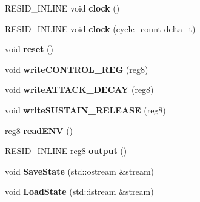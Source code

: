 \begin{DoxyCompactItemize}
\item 
\hypertarget{classEnvelopeGenerator_a5ecc39fc11bc972f8648734f4cc0cf89}{R\-E\-S\-I\-D\-\_\-\-I\-N\-L\-I\-N\-E void {\bfseries clock} ()}\label{classEnvelopeGenerator_a5ecc39fc11bc972f8648734f4cc0cf89}

\item 
\hypertarget{classEnvelopeGenerator_ad5946858b8f732804c1d030c1af5359e}{R\-E\-S\-I\-D\-\_\-\-I\-N\-L\-I\-N\-E void {\bfseries clock} (cycle\-\_\-count delta\-\_\-t)}\label{classEnvelopeGenerator_ad5946858b8f732804c1d030c1af5359e}

\item 
\hypertarget{classEnvelopeGenerator_a64179e4784e307cf16f4933f225dbcbc}{void {\bfseries reset} ()}\label{classEnvelopeGenerator_a64179e4784e307cf16f4933f225dbcbc}

\item 
\hypertarget{classEnvelopeGenerator_a4b15ac369e854d24f544680629b1729d}{void {\bfseries write\-C\-O\-N\-T\-R\-O\-L\-\_\-\-R\-E\-G} (reg8)}\label{classEnvelopeGenerator_a4b15ac369e854d24f544680629b1729d}

\item 
\hypertarget{classEnvelopeGenerator_afee0b414ba85d6ecdb367b988db866b7}{void {\bfseries write\-A\-T\-T\-A\-C\-K\-\_\-\-D\-E\-C\-A\-Y} (reg8)}\label{classEnvelopeGenerator_afee0b414ba85d6ecdb367b988db866b7}

\item 
\hypertarget{classEnvelopeGenerator_abf45adc8d4e07dfaed8829159946724a}{void {\bfseries write\-S\-U\-S\-T\-A\-I\-N\-\_\-\-R\-E\-L\-E\-A\-S\-E} (reg8)}\label{classEnvelopeGenerator_abf45adc8d4e07dfaed8829159946724a}

\item 
\hypertarget{classEnvelopeGenerator_a895dcd9c29340fb397a649ea07be6bef}{reg8 {\bfseries read\-E\-N\-V} ()}\label{classEnvelopeGenerator_a895dcd9c29340fb397a649ea07be6bef}

\item 
\hypertarget{classEnvelopeGenerator_af9bedd480853675e129dd08d67f79689}{R\-E\-S\-I\-D\-\_\-\-I\-N\-L\-I\-N\-E reg8 {\bfseries output} ()}\label{classEnvelopeGenerator_af9bedd480853675e129dd08d67f79689}

\item 
\hypertarget{classEnvelopeGenerator_a19a08268e0949a509d0cf1140da463dc}{void {\bfseries Save\-State} (std\-::ostream \&stream)}\label{classEnvelopeGenerator_a19a08268e0949a509d0cf1140da463dc}

\item 
\hypertarget{classEnvelopeGenerator_a6bc5fa20ee5623cf435820ed892c022c}{void {\bfseries Load\-State} (std\-::istream \&stream)}\label{classEnvelopeGenerator_a6bc5fa20ee5623cf435820ed892c022c}

\end{DoxyCompactItemize}
